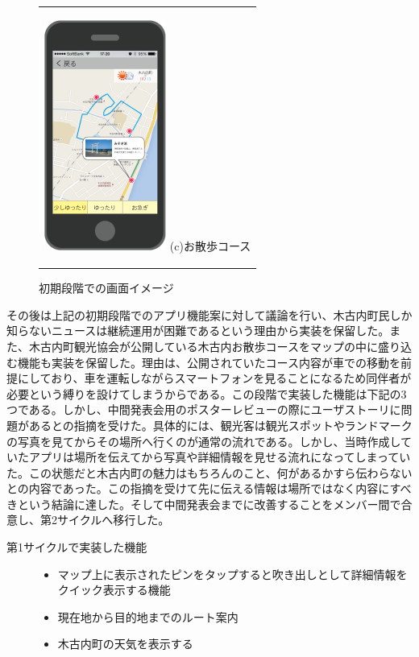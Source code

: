 \begin{figure}[htbp]
\begin{center}
\begin{tabular}{c}
      \begin{minipage}{0.33\hsize}
        \begin{center}
\includegraphics[width=4cm, bb=0 0 302 572]{5.2_sanpo.png}
          \hspace{1cm} (c)お散歩コース
        \end{center}
      \end{minipage}

    \end{tabular}
    \caption{初期段階での画面イメージ}
    \label{fig:lena}
  \end{center}
\end{figure}

その後は上記の初期段階でのアプリ機能案に対して議論を行い、木古内町民しか知らないニュースは継続運用が困難であるという理由から実装を保留した。また、木古内町観光協会が公開している木古内お散歩コースをマップの中に盛り込む機能も実装を保留した。理由は、公開されていたコース内容が車での移動を前提にしており、車を運転しながらスマートフォンを見ることになるため同伴者が必要という縛りを設けてしまうからである。この段階で実装した機能は下記の3つである。しかし、中間発表会用のポスターレビューの際にユーザストーリに問題があるとの指摘を受けた。具体的には、観光客は観光スポットやランドマークの写真を見てからその場所へ行くのが通常の流れである。しかし、当時作成していたアプリは場所を伝えてから写真や詳細情報を見せる流れになってしまっていた。この状態だと木古内町の魅力はもちろんのこと、何があるかすら伝わらないとの内容であった。この指摘を受けて先に伝える情報は場所ではなく内容にすべきという結論に達した。そして中間発表会までに改善することをメンバー間で合意し、第2サイクルへ移行した。
\begin{description}
\item[第1サイクルで実装した機能]\mbox{}
\begin{itemize}
 \item マップ上に表示されたピンをタップすると吹き出しとして詳細情報をクイック表示する機能
 \item 現在地から目的地までのルート案内
 \item 木古内町の天気を表示する
\end{itemize}
\end{description}

